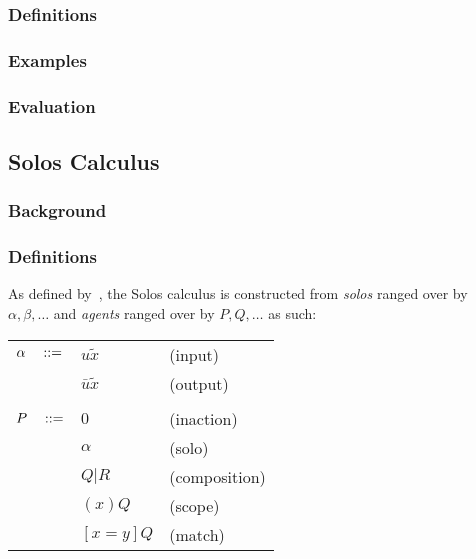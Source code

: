 \documentclass{article}
\begin{document}
        \subsubsection{Definitions}


        \subsubsection{Examples}


        \subsubsection{Evaluation}



    \subsection{Solos Calculus}

        \subsubsection{Background}
            \cite{acyclic-solos}


        \subsubsection{Definitions}
            As defined by~\cite{solo-calculus}, the Solos calculus is constructed from \textit{solos} ranged over by $\alpha,\beta,\ldots$ and \textit{agents} ranged over by $P,Q,\ldots$ as such:
                \begin{center}
                    \begin{tabular}{ l l l }
                        $\alpha \quad ::=$   & $u\tilde{x}$          & (input) \\
                                                & $\bar{u}\tilde{x}$    & (output) \\ \\
                        $P \quad ::=$        & $0$                   & (inaction) \\
                                                & $\alpha$              & (solo) \\
                                                & $Q | R$               & (composition) \\
                                                & $(x)Q$                & (scope) \\
                                                & $[x=y]Q$              & (match) \\
                    \end{tabular}
                \end{center}
\end{document}
